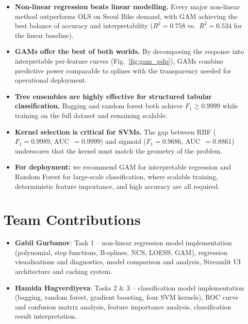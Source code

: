 \documentclass[conference]{IEEEtran}
\begin{document}
\begin{itemize}
  \item \textbf{Non-linear regression beats linear modelling.} Every major
    non-linear method outperforms OLS on Seoul Bike demand, with GAM achieving
    the best balance of accuracy and interpretability ($R^2 = 0.758$ vs.\
    $R^2 = 0.534$ for the linear baseline).
  \item \textbf{GAMs offer the best of both worlds.} By decomposing the
    response into interpretable per-feature curves (Fig.~\ref{fig:gam_pdp}),
    GAMs combine predictive power comparable to splines with the transparency
    needed for operational deployment.
  \item \textbf{Tree ensembles are highly effective for structured tabular
    classification.} Bagging and random forest both achieve $F_1 \geq 0.9999$
    while training on the full dataset and remaining scalable.
  \item \textbf{Kernel selection is critical for SVMs.} The gap between RBF
    ($F_1 = 0.9989$, AUC~$= 0.9999$) and sigmoid
    ($F_1 = 0.9686$, AUC~$= 0.8861$) underscores that the kernel must match
    the geometry of the problem.
  \item \textbf{For deployment:} we recommend GAM for interpretable regression
    and Random Forest for large-scale classification, where scalable training,
    deterministic feature importance, and high accuracy are all required.
\end{itemize}

\section{Team Contributions}\label{sec:contributions}

\begin{itemize}
  \item \textbf{Gabil Gurbanov}: Task 1 -- non-linear regression model
    implementation (polynomial, step functions, B-splines, NCS, LOESS, GAM),
    regression visualisations and diagnostics, model comparison and analysis,
    Streamlit UI architecture and caching system.
  \item \textbf{Hamida Hagverdiyeva}: Tasks 2 \& 3 -- classification model
    implementation (bagging, random forest, gradient boosting, four SVM
    kernels), ROC curve and confusion matrix analysis, feature importance
    analysis, classification result interpretation.
\end{itemize}
\end{document}
